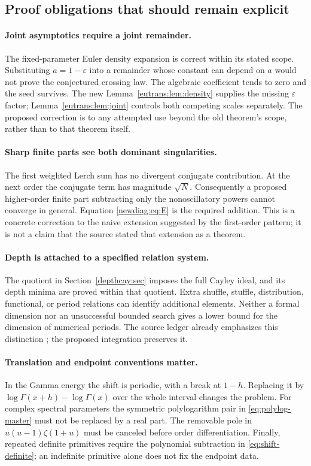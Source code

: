 \documentclass[11pt,a4paper]{article}
\numberwithin{equation}{section}
\theoremstyle{definition}
\theoremstyle{remark}
\begin{document}
\subsection{Proof obligations that should remain explicit}

\paragraph{Joint asymptotics require a joint remainder.}
The fixed-parameter Euler density expansion is correct within its stated
scope. Substituting $a=1-\varepsilon$ into a remainder whose constant can
depend on $a$ would not prove the conjectured crossing law. The algebraic
coefficient tends to zero and the seed survives. The new
Lemma~\ref{eutrans:lem:density} supplies the missing $\varepsilon$ factor;
Lemma~\ref{eutrans:lem:joint} controls both competing scales separately.
The proposed correction is to any attempted use beyond the old theorem's
scope, rather than to that theorem itself.

\paragraph{Sharp finite parts see both dominant singularities.}
The first weighted Lerch sum has no divergent conjugate contribution.
At the next order the conjugate term has magnitude $\sqrt N$.
Consequently a proposed higher-order finite part subtracting only the
nonoscillatory powers cannot converge in general. Equation
\eqref{newdiag:eq:E} is the required addition. This is a concrete
correction to the naive extension suggested by the first-order pattern;
it is not a claim that the source stated that extension as a theorem.

\paragraph{Depth is attached to a specified relation system.}
The quotient in Section~\ref{depthcay:sec} imposes the full Cayley ideal,
and its depth minima are proved within that quotient. Extra shuffle,
stuffle, distribution, functional, or period relations can identify
additional elements. Neither a formal dimension nor an unsuccessful
bounded search gives a lower bound for the dimension of numerical
periods. The source ledger already emphasizes this distinction
\cite{RepoManuscript}; the proposed integration preserves it.

\paragraph{Translation and endpoint conventions matter.}
In the Gamma energy the shift is periodic, with a break at $1-h$.
Replacing it by $\log\Gamma(x+h)-\log\Gamma(x)$ over the whole interval
changes the problem. For complex spectral parameters the symmetric
polylogarithm pair in \eqref{eq:polylog-master} must not be replaced
by a real part. The removable pole in
$u(u-1)\zeta(1+u)$ must be canceled before order differentiation.
Finally, repeated definite primitives require the polynomial subtraction
in \eqref{eq:shift-definite}; an indefinite primitive alone does not fix
the endpoint data.
\end{document}

